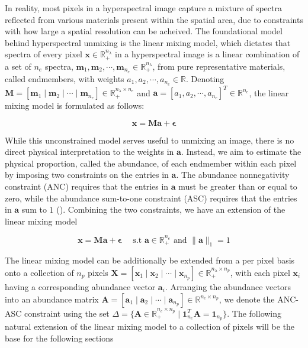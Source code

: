 In reality, most pixels in a hyperspectral image capture a mixture of spectra reflected from various materials present within the spatial area, due to constraints with how large a spatial resolution can be acheived. The foundational model behind hyperspectral unmixing is the linear mixing model, which dictates that spectra of every pixel $\mathbf{x} \in \mathbb{R}_+^{n_\lambda}$ in a hyperspectral image is a linear combination of a set of $n_e$ spectra, $\mathbf{m} _1, \mathbf{m} _2, \cdots, \mathbf{m} _{n_e} \in \mathbb{R}_+^{n_\lambda}$, from pure representative materials, called endmembers, with weights $a_1, a_2, \cdots, a_{n_e} \in \mathbb{R}$. Denoting $\mathbf{M} = [\mathbf{m} _1 \;|\; \mathbf{m} _2 \;|\; \cdots \;|\; \mathbf{m} _{n_e}] \in \mathbb{R}_+^{n_\lambda \times n_e}$ and $\mathbf{a} = [a_1, a_2, \cdots ,a_{n_e}]^T \in \mathbb{R}^{n_e}$, the linear mixing model is formulated as follows:

\begin{equation}
    \label{lmm:model}
    \mathbf{x} = \mathbf{M} \mathbf{a} + \mathbf{\epsilon} 
\end{equation}

While this unconstrained model serves useful to unmixing an image, there is no direct physical interpretation to the weights in $\mathbf{a}$. Instead, we aim to estimate the physical proportion, called the abundance, of each endmember within each pixel by imposing two constraints on the entries in $\mathbf{a}$. The abundance nonnegativity constraint (ANC) requires that the entries in $\mathbf{a}$ must be greater than or equal to zero, while the abundance sum-to-one constraint (ASC) requires that the entries in $\mathbf{a}$ sum to $1$ (\cite{UNMIX}). Combining the two constraints, we have an extension of the linear mixing model

\begin{equation}
    \label{lmm:abund-lmm}
    \mathbf{x} = \mathbf{M} \mathbf{a} + \mathbf{\epsilon} \quad \text{ s.t } \mathbf{a} \in \mathbb{R}_+^{n_e} \text{ and } \|\mathbf{a}\|_1 = 1 
\end{equation}

The linear mixing model can be additionally be extended from a per pixel basis onto a collection of $n_p$ pixels $\mathbf{X} = [\mathbf{x}_1 \;|\; \mathbf{x}_2 \;|\; \cdots \;|\; \mathbf{x}_{n_p}] \in \mathbb{R}_ +^{n_\lambda \times n_p}$, with each pixel $\mathbf{x}_i$ having a corresponding abundance vector $\mathbf{a}_i$. Arranging the abundance vectors into an abundance matrix $\mathbf{A} = [\mathbf{a}_1 \;|\; \mathbf{a}_2 \;|\; \cdots \;|\; \mathbf{a}_{n_p} ] \in \mathbb{R}^{n_e \times n_p}$, we denote the ANC-ASC constraint using the set $ \Delta = \{ \mathbf{A} \in \mathbb{R}_+^{n_e \times n_p} \mid \mathbf{1}_{n_e}^T \mathbf{A} = \mathbf{1}_{n_p}\} $. The following natural extension of the linear mixing model to a collection of pixels will be the base for the following sections

